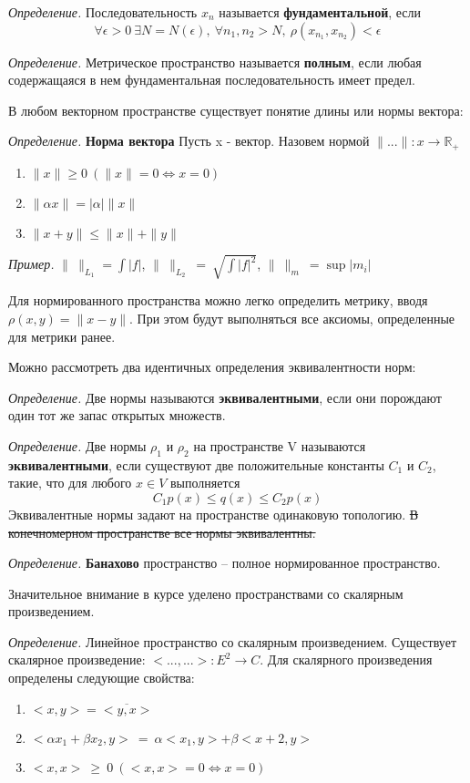 \documentclass[12pt]{article}
\newcommand{\example}{{\itshape Пример. }}
\newcommand{\equals}{\Leftrightarrow}
\newcommand{\defi}{{\itshape Определение. }}
\renewcommand{\leq}{\leqslant}
\renewcommand{\geq}{\geqslant}
\begin{document}
	\defi Последовательность $x_n$ называется \textbf{фундаментальной}, если
	$$\forall \epsilon > 0 ~\exists N = N(\epsilon),~ \forall n_1, n_2 > N,~ \rho(x_{n_1}, x_{n_2}) < \epsilon$$

	\defi Метрическое пространство называется \textbf{полным}, если любая содержащаяся в нем фундаментальная последовательность имеет предел.
	
	В любом векторном пространстве существует понятие длины или нормы вектора:
	
	\defi \textbf{Норма вектора} Пусть x - вектор. Назовем нормой $\|...\| : x \rightarrow \mathbb{R_+}$
	\begin{enumerate}
		\item $\|x\| \geq 0 ~(\|x\| = 0 \equals x = 0)$
		\item $\|\alpha x\| = |\alpha| \|x\|$
		\item $\|x + y\| \leq \|x\| + \|y\|$
	\end{enumerate}
	
	\example $\|~\|_{L_1} = \int {|f|}$, $\|~\|_{L_2} ~=~ \sqrt{\int {|f|^2}}$,  $\|~\|_{m} ~= \sup {|m_i|}$
	
	Для нормированного пространства можно легко определить метрику, вводя $\rho(x,y) = \|x-y\|$. При этом будут выполняться все аксиомы,
	определенные для метрики ранее.
	
	Можно рассмотреть два идентичных определения эквивалентности норм:
	
	\defi Две нормы называются \textbf{эквивалентными}, если они порождают один тот же запас открытых множеств.
	
	\defi Две нормы $\rho_1$ и $\rho_2$ на пространстве V называются \textbf{эквивалентными}, если существуют две положительные константы 
	$C_1$ и $C_2$, такие, что для любого $x \in V$ выполняется 
	$$C_1 p(x) \leq q(x) \leq C_2 p(x)$$
	Эквивалентные нормы задают на пространстве одинаковую топологию. \sout{В конечномерном пространстве все нормы эквивалентны.}
	
	\defi \textbf{Банахово} пространство -- полное нормированное пространство.
	
	Значительное внимание в курсе уделено пространствами со скалярным произведением.
	
	\defi Линейное пространство со скалярным произведением. Существует скалярное произведение: $ <...,...> : E^2 \rightarrow C$.
	Для скалярного произведения определены следующие свойства:
	\begin{enumerate} 
		\item $<x,y> = \overline{<y,x>}$
		\item $<\alpha x_1 + \beta x_2, y> ~= ~\alpha <x_1, y> + \beta <x+2, y>$
		\item $<x, x> ~\geq ~0 ~(<x, x> = 0 \equals x = 0)$
	\end{enumerate}
	
\end{document}
